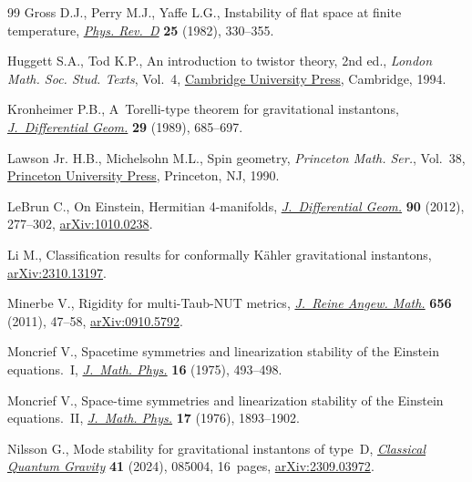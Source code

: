 \begin{thebibliography}{99}
Gross D.J., Perry M.J., Yaffe L.G., Instability of flat space at finite
 temperature, \href{https://doi.org/10.1103/PhysRevD.25.330}{\textit{Phys. Rev.~D}} \textbf{25} (1982), 330--355.

Huggett S.A., Tod K.P., An introduction to twistor theory, 2nd ed., \textit{London Math.
 Soc. Stud. Texts}, Vol.~4, \href{https://doi.org/10.1017/CBO9780511624018}{Cambridge University Press}, Cambridge,
 1994.

Kronheimer P.B., A~{T}orelli-type theorem for gravitational instantons,
 \href{https://doi.org/10.4310/jdg/1214443067}{\textit{J.~Differential Geom.}} \textbf{29} (1989), 685--697.

Lawson Jr. H.B., Michelsohn M.L., Spin geometry, \textit{Princeton Math. Ser.},
 Vol.~38, \href{https://doi.org/10.1515/9781400883912}{Princeton University Press}, Princeton, NJ, 1990.

LeBrun C., On {E}instein, {H}ermitian 4-manifolds, \href{https://doi.org/10.4310/jdg/1335230848}{\textit{J.~Differential
 Geom.}} \textbf{90} (2012), 277--302, \href{https://arxiv.org/abs/1010.0238}{arXiv:1010.0238}.

Li M., Classification results for conformally {K}\"ahler gravitational
 instantons, \href{https://arxiv.org/abs/2310.13197}{arXiv:2310.13197}.

Minerbe V., Rigidity for multi-{T}aub-{NUT} metrics, \href{https://doi.org/10.1515/CRELLE.2011.042}{\textit{J.~Reine Angew.
 Math.}} \textbf{656} (2011), 47--58, \href{https://arxiv.org/abs/0910.5792}{arXiv:0910.5792}.

Moncrief V., Spacetime symmetries and linearization stability of the {E}instein
 equations.~{I}, \href{https://doi.org/10.1063/1.522572}{\textit{J.~Math. Phys.}} \textbf{16} (1975), 493--498.

Moncrief V., Space-time symmetries and linearization stability of the
 {E}instein equations.~{II}, \href{https://doi.org/10.1063/1.522814}{\textit{J.~Math. Phys.}} \textbf{17} (1976),
 1893--1902.

Nilsson G., Mode stability for gravitational instantons of type~{D},
 \href{https://doi.org/10.1088/1361-6382/ad296f}{\textit{Classical Quantum Gravity}} \textbf{41} (2024), 085004, 16~pages,
 \href{https://arxiv.org/abs/2309.03972}{arXiv:2309.03972}.


\end{thebibliography}
